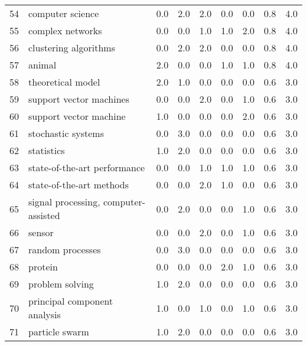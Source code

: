 \begin{tabular}{llrrrrrrr}
54 &                         computer science &   0.0 &   2.0 &   2.0 &   0.0 &   0.0 &   0.8 &    4.0 \\
55 &                         complex networks &   0.0 &   0.0 &   1.0 &   1.0 &   2.0 &   0.8 &    4.0 \\
56 &                    clustering algorithms &   0.0 &   2.0 &   2.0 &   0.0 &   0.0 &   0.8 &    4.0 \\
57 &                                   animal &   2.0 &   0.0 &   0.0 &   1.0 &   1.0 &   0.8 &    4.0 \\
58 &                        theoretical model &   2.0 &   1.0 &   0.0 &   0.0 &   0.0 &   0.6 &    3.0 \\
59 &                  support vector machines &   0.0 &   0.0 &   2.0 &   0.0 &   1.0 &   0.6 &    3.0 \\
60 &                   support vector machine &   1.0 &   0.0 &   0.0 &   0.0 &   2.0 &   0.6 &    3.0 \\
61 &                       stochastic systems &   0.0 &   3.0 &   0.0 &   0.0 &   0.0 &   0.6 &    3.0 \\
62 &                               statistics &   1.0 &   2.0 &   0.0 &   0.0 &   0.0 &   0.6 &    3.0 \\
63 &             state-of-the-art performance &   0.0 &   0.0 &   1.0 &   1.0 &   1.0 &   0.6 &    3.0 \\
64 &                 state-of-the-art methods &   0.0 &   0.0 &   2.0 &   1.0 &   0.0 &   0.6 &    3.0 \\
65 &     signal processing, computer-assisted &   0.0 &   2.0 &   0.0 &   0.0 &   1.0 &   0.6 &    3.0 \\
66 &                                   sensor &   0.0 &   0.0 &   2.0 &   0.0 &   1.0 &   0.6 &    3.0 \\
67 &                         random processes &   0.0 &   3.0 &   0.0 &   0.0 &   0.0 &   0.6 &    3.0 \\
68 &                                  protein &   0.0 &   0.0 &   0.0 &   2.0 &   1.0 &   0.6 &    3.0 \\
69 &                          problem solving &   1.0 &   2.0 &   0.0 &   0.0 &   0.0 &   0.6 &    3.0 \\
70 &             principal component analysis &   1.0 &   0.0 &   1.0 &   0.0 &   1.0 &   0.6 &    3.0 \\
71 &                           particle swarm &   1.0 &   2.0 &   0.0 &   0.0 &   0.0 &   0.6 &    3.0 \\

\end{tabular}
